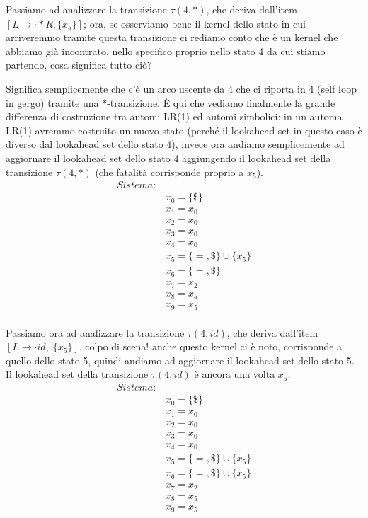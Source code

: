 \documentclass[class=book, crop=false, oneside, 12pt]{standalone}
\begin{document}
Passiamo ad analizzare la transizione \(\tau(4,*)\), che deriva dall'item \([L \to \cdot * R, \{x_5\}]\); ora, se osserviamo bene il kernel dello stato in cui arriveremmo tramite questa transizione ci rediamo conto che è un kernel che abbiamo già incontrato, nello specifico proprio nello stato 4 da cui stiamo partendo, cosa significa tutto ciò?

Significa semplicemente che c'è un arco uscente da 4 che ci riporta in 4 (self loop in gergo) tramite una \(*\)-transizione. È qui che vediamo finalmente la grande differenza di costruzione tra automi LR(1) ed automi simbolici: in un automa LR(1) avremmo costruito un nuovo stato (perché il lookahead set in questo caso è diverso dal lookahead set dello stato 4), invece ora andiamo semplicemente ad aggiornare il lookahead set dello stato 4 aggiungendo il lookahead set della transizione  \(\tau(4,*)\) (che fatalità corrisponde proprio a \(x_5\)).
\begin{align*}
    Sistema:& \\
            & x_0 = \{\$\} \\
            & x_1 = x_0 \\
            & x_2 = x_0 \\
            & x_3 = x_0 \\
            & x_4 = x_0 \\
            & x_5 = \{=, \$\} \cup \{x_5\} \\
            & x_6 = \{=, \$\} \\
            & x_7 = x_2 \\
            & x_8 = x_5 \\
            & x_9 = x_5 \\
\end{align*}

Passiamo ora ad analizzare la transizione \(\tau(4, id)\), che deriva dall'item \([L \to \cdot id, \; \{x_5\}]\), colpo di scena! anche questo kernel ci è noto, corrisponde a quello dello stato 5, quindi andiamo ad aggiornare il lookahead set dello stato 5.
Il lookahead set della transizione \(\tau(4, id)\) è ancora una volta \(x_5\).
\begin{align*}
    Sistema:& \\
            & x_0 = \{\$\} \\
            & x_1 = x_0 \\
            & x_2 = x_0 \\
            & x_3 = x_0 \\
            & x_4 = x_0 \\
            & x_5 = \{=, \$\} \cup \{x_5\} \\
            & x_6 = \{=, \$\} \cup \{x_5\} \\
            & x_7 = x_2 \\
            & x_8 = x_5 \\
            & x_9 = x_5 \\
\end{align*}
\end{document}
